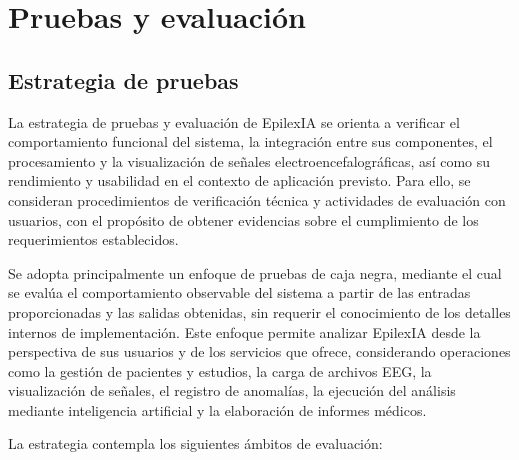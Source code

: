 
\chapter{Pruebas y evaluación}
\label{pruebas_evaluacion}

\section{Estrategia de pruebas}
\label{sec:estrategia_pruebas}

La estrategia de pruebas y evaluación de EpilexIA se orienta a verificar el comportamiento funcional del sistema, la integración entre sus componentes, el procesamiento y la visualización de señales electroencefalográficas, así como su rendimiento y usabilidad en el contexto de aplicación previsto. Para ello, se consideran procedimientos de verificación técnica y actividades de evaluación con usuarios, con el propósito de obtener evidencias sobre el cumplimiento de los requerimientos establecidos.

Se adopta principalmente un enfoque de pruebas de caja negra, mediante el cual se evalúa el comportamiento observable del sistema a partir de las entradas proporcionadas y las salidas obtenidas, sin requerir el conocimiento de los detalles internos de implementación. Este enfoque permite analizar EpilexIA desde la perspectiva de sus usuarios y de los servicios que ofrece, considerando operaciones como la gestión de pacientes y estudios, la carga de archivos EEG, la visualización de señales, el registro de anomalías, la ejecución del análisis mediante inteligencia artificial y la elaboración de informes médicos.

La estrategia contempla los siguientes ámbitos de evaluación:

